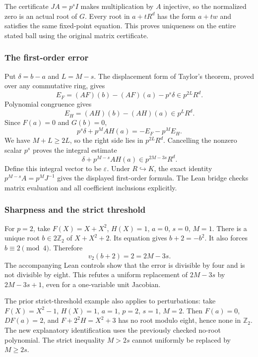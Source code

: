 The certificate \(JA=p^sI\) makes multiplication by \(A\) injective, so
the normalized zero is an actual root of \(G\). Every root in \(a+tR^d\)
has the form \(a+tw\) and satisfies the same fixed-point equation. This
proves uniqueness on the entire stated ball using the original matrix
certificate.

\hypertarget{cont7:the-first-order-error}{%
\subsubsection{The first-order error}\label{cont7:the-first-order-error}}

Put \(\delta=b-a\) and \(L=M-s\). The displacement form of Taylor's
theorem, proved over any commutative ring, gives \[
E_F=(AF)(b)-(AF)(a)-p^s\delta\in p^{2L}R^d.
\] Polynomial congruence gives \[
E_H=(AH)(b)-(AH)(a)\in p^LR^d.
\] Since \(F(a)=0\) and \(G(b)=0\), \[
p^s\delta+p^MAH(a)=-E_F-p^ME_H.
\] We have \(M+L\ge2L\), so the right side lies in \(p^{2L}R^d\).
Cancelling the nonzero scalar \(p^s\) proves the integral estimate \[
\delta+p^{M-s}AH(a)\in p^{2M-3s}R^d.
\] Define this integral vector to be \(\varepsilon\). Under
\(R\hookrightarrow K\), the exact identity \(p^{M-s}A=p^MJ^{-1}\) gives
the displayed first-order formula. The Lean bridge checks matrix
evaluation and all coefficient inclusions explicitly.

\hypertarget{cont7:sharpness-and-the-strict-threshold}{%
\subsubsection{Sharpness and the strict
threshold}\label{cont7:sharpness-and-the-strict-threshold}}

For \(p=2\), take \(F(X)=X+X^2\), \(H(X)=1\), \(a=0\), \(s=0\), \(M=1\).
There is a unique root \(b\in2\mathbb Z_2\) of \(X+X^2+2\). Its equation
gives \(b+2=-b^2\). It also forces \(b\equiv2\pmod4\). Therefore \[
v_2(b+2)=2=2M-3s.
\] The accompanying Lean controls show that the error is divisible by
four and is not divisible by eight. This refutes a uniform replacement
of \(2M-3s\) by \(2M-3s+1\), even for a one-variable unit Jacobian.

The prior strict-threshold example also applies to perturbations: take
\(F(X)=X^2-1\), \(H(X)=1\), \(a=1\), \(p=2\), \(s=1\), \(M=2\). Then
\(F(a)=0\), \(DF(a)=2\), and \(F+2^2H=X^2+3\) has no root modulo eight,
hence none in \(\mathbb Z_2\). The new explanatory identification uses
the previously checked no-root polynomial. The strict inequality
\(M>2s\) cannot uniformly be replaced by \(M\ge2s\).
